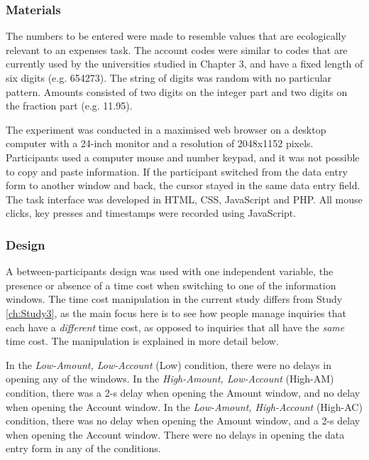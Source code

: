 \subsubsection{Materials}
The numbers to be entered were made to resemble values that are ecologically relevant to an expenses task. The account codes were similar to codes that are currently used by the universities studied in Chapter 3, and have a fixed length of six digits (e.g. 654273). The string of digits was random with no particular pattern. Amounts consisted of two digits on the integer part and two digits on the fraction part (e.g. 11.95). 

The experiment was conducted in a maximised web browser on a desktop computer with a 24-inch monitor and a resolution of 2048x1152 pixels. Participants used a computer mouse and number keypad, and it was not possible to copy and paste information. If the participant switched from the data entry form to another window and back, the cursor stayed in the same data entry field. The task interface was developed in HTML, CSS, JavaScript and PHP. All mouse clicks, key presses and timestamps were recorded using JavaScript.

\subsubsection{Design}
A between-participants design was used with one independent variable, the presence or absence of a time cost when switching to one of the information windows. The time cost manipulation in the current study differs from Study \ref{ch:Study3}, as the main focus here is to see how people manage inquiries that each have a \textit{different} time cost, as opposed to inquiries that all have the \textit{same} time cost. The manipulation is explained in more detail below. 

In the \textit{Low-Amount, Low-Account} (Low) condition, there were no delays in opening any of the windows. In the \textit{High-Amount, Low-Account} (High-AM) condition, there was a 2-s delay when opening the Amount window, and no delay when opening the Account window. In the \textit{Low-Amount, High-Account} (High-AC) condition, there was no delay when opening the Amount window, and a 2-s delay when opening the Account window. There were no delays in opening the data entry form in any of the conditions.

